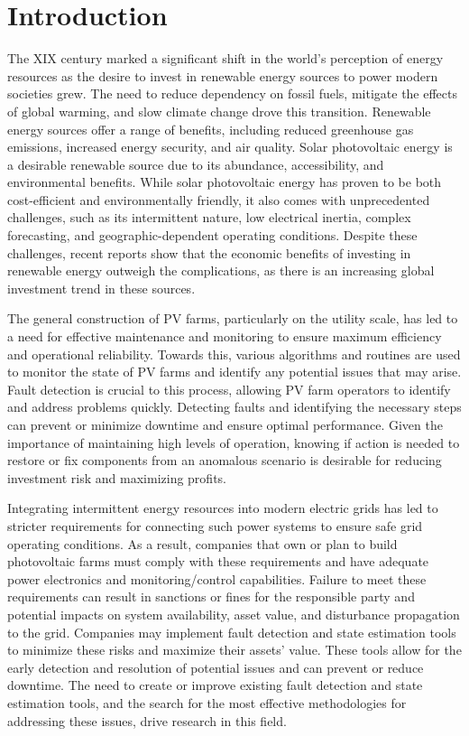 \chapter{Introduction} \label{chap:chap1}


The XIX century marked a significant shift in the world's perception of energy resources as the desire to invest in renewable energy sources to power modern societies grew. The need to reduce dependency on fossil fuels, mitigate the effects of global warming, and slow climate change drove this transition. Renewable energy sources offer a range of benefits, including reduced greenhouse gas emissions, increased energy security, and air quality. Solar photovoltaic energy is a desirable renewable source due to its abundance, accessibility, and environmental benefits. While solar photovoltaic energy has proven to be both cost-efficient and environmentally friendly, it also comes with unprecedented challenges, such as its intermittent nature, low electrical inertia, complex forecasting, and geographic-dependent operating conditions. Despite these challenges, recent reports \cite{cap} show that the economic benefits of investing in renewable energy outweigh the complications, as there is an increasing global investment trend in these sources.

The general construction of PV farms, particularly on the utility scale, has led to a need for effective maintenance and monitoring to ensure maximum efficiency and operational reliability. Towards this, various algorithms and routines are used to monitor the state of PV farms and identify any potential issues that may arise. Fault detection is crucial to this process, allowing PV farm operators to identify and address problems quickly. Detecting faults and identifying the necessary steps can prevent or minimize downtime and ensure optimal performance. Given the importance of maintaining high levels of operation, knowing if action is needed to restore or fix components from an anomalous scenario is desirable for reducing investment risk and maximizing profits.

Integrating intermittent energy resources into modern electric grids has led to stricter requirements for connecting such power systems to ensure safe grid operating conditions. As a result, companies that own or plan to build photovoltaic farms must comply with these requirements and have adequate power electronics and monitoring/control capabilities. Failure to meet these requirements can result in sanctions or fines for the responsible party and potential impacts on system availability, asset value, and disturbance propagation to the grid. Companies may implement fault detection and state estimation tools to minimize these risks and maximize their assets' value. These tools allow for the early detection and resolution of potential issues and can prevent or reduce downtime. The need to create or improve existing fault detection and state estimation tools, and the search for the most effective methodologies for addressing these issues, drive research in this field.

